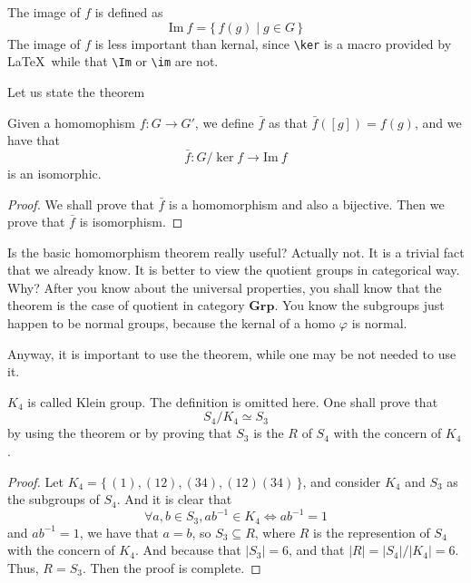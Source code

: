 \documentclass[../main.tex]{subfiles}
\begin{document}
\begin{definition}[Image]\label{def:Image}
	The image of \(f\) is defined as 
	\[
		\text{Im}\ f = \{ \, f (g) \mid g \in G\,\}
		\]
		The image of \(f\) is less important than kernal, since \verb|\ker| is a macro provided by \LaTeX\ while that \verb|\Im| or \verb|\im| are not.
\end{definition}
Let us state the theorem
\begin{thm}
	\label{a basic theorem of quotients}
	Given a homomophism \(f \colon G \to G'\), we define \(\bar f\) as that \( \bar f ([g]) = f(g)\), and we have that 
	\[
		\bar f \colon G/ \ker f \to \text{Im}\ f
		\]
		is an isomorphic.
\end{thm}
\begin{proof}
	We shall prove that \(\bar f\) is a homomorphism and also a bijective. Then we prove that \(\bar f\) is isomorphism.
\end{proof}
Is the basic homomorphism theorem really useful? Actually not. It is a trivial fact that we already know. It is better to view the quotient groups in categorical way. Why? After you know about the universal properties, you shall know that the theorem is the case of quotient in category \(\textbf{Grp}\). You know the subgroups just happen to be normal groups, because the kernal of a homo \(\varphi\) is normal.

Anyway, it is important to use the theorem, while one may be not needed to use it.
\begin{exam}
	\(K_{4}\) is called Klein group. The definition is omitted here. One shall prove that 
	\[
		S_{4}/K_{4} \simeq S_{3}
	\]
	by using the theorem or by proving  that \(S _{3}\) is the \(R\) of \(S_{4}\) with the concern of \(K_{4}\).
\end{exam}
\begin{proof}
	Let \(K_{4} = \{ \, (1), (12), (34),(12)(34) \, \}\), and consider \(K _{4}\) and \( S_{3}\) as the subgroups of \(S _{4}\). And it is clear that
	\[
	\forall a, b \in S_{3}, a b^{-1} \in K _{4} \iff ab ^{-1} = 1
	\]
and \( a b ^{-1} = 1\), we have that \(a  =  b\), so \( S_{3} \subseteq R\), where \(R\) is the represention of \(S _{4}\) with the concern of \(K _{4}\). And because that \(\vert S _{3} \vert = 6\), and that \(\vert R \vert = \vert S_{4}\vert \big/ \vert K_{4} \vert = 6\). Thus, \(R = S_{3}\). Then the proof is complete. 
\end{proof}
\end{document}
